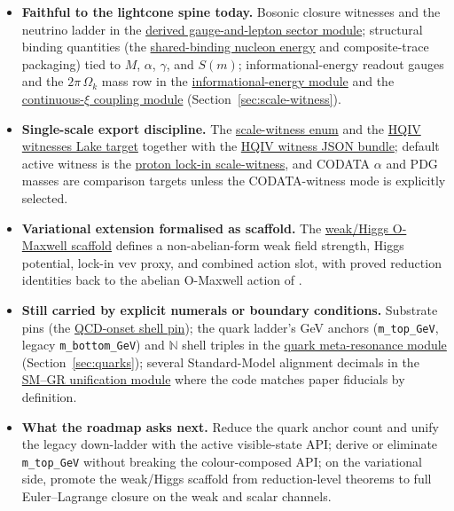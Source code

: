 \documentclass[11pt]{article}
\begin{document}
\begin{itemize}[leftmargin=2em]
  \item \textbf{Faithful to the lightcone spine today.}
    Bosonic closure witnesses and the neutrino ladder in the
    \hyperref[lean:gauge-lepton]{derived gauge-and-lepton
    sector module}; structural binding quantities (the
    \hyperref[lean:shared-binding]{shared-binding nucleon
    energy} and composite-trace packaging) tied to $M$,
    $\alpha$, $\gamma$, and $S(m)$; informational-energy
    readout gauges and the $2\pi\,\Omega_k$ mass row in the
    \hyperref[lean:info-energy]{informational-energy module}
    and the
    \hyperref[lean:cont-xi-coupling]{continuous-$\xi$
    coupling module} (Section~\ref{sec:scale-witness}).
  \item \textbf{Single-scale export discipline.} The
    \hyperref[lean:scale-witness]{scale-witness enum} and the
    \hyperref[lean:hqiv-witnesses]{HQIV witnesses Lake
    target} together with the
    \hyperref[lean:witnesses-json]{HQIV witness JSON bundle};
    default active witness is the
    \hyperref[lean:proton-lockin]{proton lock-in
    scale-witness}, and CODATA $\alpha$ \cite{codata2018} and
    PDG masses \cite{pdg2024} are comparison targets unless
    the CODATA-witness mode is explicitly selected.
  \item \textbf{Variational extension formalised as scaffold.}
    The
    \hyperref[lean:weak-higgs]{weak/Higgs O-Maxwell scaffold}
    defines a non-abelian-form weak field strength, Higgs
    potential, lock-in vev proxy, and combined action slot,
    with proved reduction identities back to the abelian
    O-Maxwell action of \cite{hqiv-oct-action-paper}.
  \item \textbf{Still carried by explicit numerals or
    boundary conditions.} Substrate pins (the
    \hyperref[lean:qcd-shell]{QCD-onset shell pin}); the
    quark ladder's GeV anchors (\texttt{m\_top\_GeV}, legacy
    \texttt{m\_bottom\_GeV}) and $\mathbb{N}$ shell triples
    in the
    \hyperref[lean:quark-meta]{quark meta-resonance module}
    (Section~\ref{sec:quarks}); several Standard-Model
    alignment decimals in the
    \hyperref[lean:sm-gr]{SM--GR unification module} where
    the code matches paper fiducials by definition.
  \item \textbf{What the roadmap asks next.}
    Reduce the quark anchor count and unify the legacy
    down-ladder with the active visible-state API; derive or
    eliminate \texttt{m\_top\_GeV} without breaking the
    colour-composed API; on the variational side, promote
    the weak/Higgs scaffold from reduction-level theorems to
    full Euler--Lagrange closure on the weak and scalar
    channels.
\end{itemize}
\end{document}
